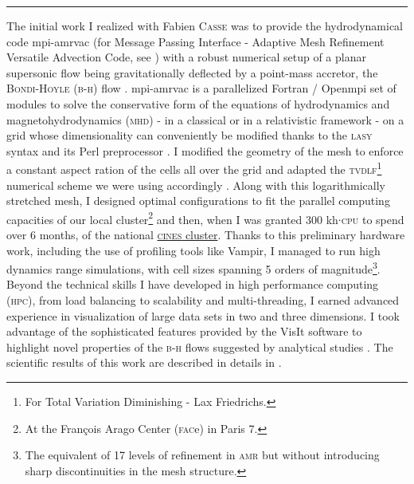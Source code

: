 \documentclass[a4paper,12pt,onecolumn]{article}
\newcommand{\ignore}[1]{}
\begin{document}
\begin{center}
\rule{0.25\textwidth}{1pt}
\end{center}
\newpage
\indent \indent The initial work I realized with Fabien \textsc{Casse} was to provide the hydrodynamical code {\sc mpi-amrvac} (for Message Passing Interface - Adaptive Mesh Refinement Versatile Advection Code, see \cite{Porth:2014wv}) with a robust numerical setup of a planar supersonic flow being gravitationally deflected by a point-mass accretor, the \textsc{Bondi-Hoyle} (\textsc{b-h}) flow \cite{Hoyle:1939fl,Bondi1944}. \ignore{The first version of {\sc mpi-amrvac}, \textsc{vac}, was developed in the 90's by Gabor \textsc{T\'oth} and Rony \textsc{Keppens}. }{\sc mpi-amrvac} is a parallelized Fortran / Open{\sc mpi} set of modules to solve the conservative form of the equations of hydrodynamics and magnetohydrodynamics (\textsc{mhd}) - in a classical or in a relativistic framework - on a grid whose dimensionality can conveniently be modified thanks to the \textsc{lasy} syntax and its Perl preprocessor \citep{Toth1997}. I modified the geometry of the mesh to enforce a constant aspect ration of the cells all over the grid and adapted the \textsc{tvdlf}\footnote{For Total Variation Diminishing - Lax Friedrichs.} numerical scheme we were using accordingly \citep{Mignone2014}. Along with this logarithmically stretched mesh, I designed optimal configurations to fit the parallel computing capacities of our local cluster\footnote{At the Fran\c cois Arago Center (\textsc{fac}e) in Paris 7.} and then, when I was granted 300 kh$\cdot$\textsc{cpu} to spend over 6 months, of the national \href{https://www.cines.fr/en/}{\textsc{cines} cluster}. Thanks to this preliminary hardware work, including the use of profiling tools like Vampir, I managed to run high dynamics range simulations, with cell sizes spanning 5 orders of magnitude\footnote{The equivalent of 17 levels of refinement in \textsc{amr} but without introducing sharp discontinuities in the mesh structure.}. Beyond the technical skills I have developed in high performance computing (\textsc{hpc}), from load balancing to scalability and multi-threading, I earned advanced experience in visualization of large data sets in two and three dimensions. I took advantage of the sophisticated features provided by the VisIt software to highlight novel properties of the \textsc{b-h} flows suggested by analytical studies \citep{Foglizzo1996}. The scientific results of this work are described in details in \cite{ElMellah2015}.\\
\end{document}
